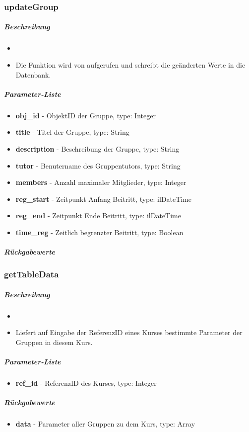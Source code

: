 \subsubsection*{updateGroup}\label{updateGroupGDGUI}
\subparagraph{Beschreibung}
\begin{itemize}
	\item[]  \noindent{} 
	\item[] Die Funktion wird von  aufgerufen und schreibt die geänderten Werte in die Datenbank.
\end{itemize}
\subparagraph{Parameter-Liste}
\begin{itemize}
	\item[] \textbf{obj\_id} - ObjektID der Gruppe, type: Integer
	\item[] \textbf{title} - Titel der Gruppe, type: String
	\item[] \textbf{description} - Beschreibung der Gruppe, type: String
	\item[] \textbf{tutor} - Benutername des Gruppentutors, type: String
	\item[] \textbf{members} - Anzahl maximaler Mitglieder, type: Integer
	\item[] \textbf{reg\_start} - Zeitpunkt Anfang Beitritt, type: ilDateTime
	\item[] \textbf{reg\_end} - Zeitpunkt Ende Beitritt, type: ilDateTime
	\item[] \textbf{time\_reg} - Zeitlich begrenzter Beitritt, type: Boolean
\end{itemize}
\subparagraph{Rückgabewerte}

\subsubsection*{getTableData}\label{getTableDataGDGUI}
\subparagraph{Beschreibung}
\begin{itemize}
	\item[] \noindent{}
	\item[] Liefert auf Eingabe der ReferenzID eines Kurses bestimmte Parameter der Gruppen in diesem Kurs.
\end{itemize}
\subparagraph{Parameter-Liste}
\begin{itemize}
	\item[] \textbf{ref\_id} - ReferenzID des Kurses, type: Integer
\end{itemize}
\subparagraph{Rückgabewerte}
\begin{itemize}
	\item[] \textbf{data} - Parameter aller Gruppen zu dem Kurs, type: Array
\end{itemize}


